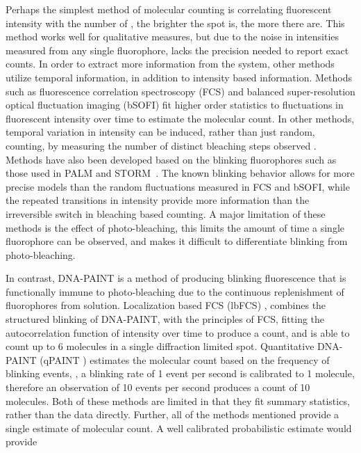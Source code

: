 Perhaps the simplest method of molecular counting is correlating fluorescent
  intensity with the number of \smallobjects \cite{schmied_2012, tolar_2005}, \ie the brighter the spot is, the more there are.
  This method works well for qualitative measures, but due to the noise in intensities 
  measured from any single fluorophore, lacks the precision needed to report exact counts.
  In order to extract more information from the system, other methods utilize temporal information, 
  in addition to intensity based information. 
  Methods such as fluorescence correlation spectroscopy (FCS) \cite{otsuka_2023, wachsmuth_2015, politi_2018} and 
  balanced super-resolution optical fluctuation imaging (bSOFI) \cite{geissbuehler_2012}
  fit higher order statistics to fluctuations in fluorescent intensity over time to estimate the molecular count.
  In other methods, temporal variation in intensity can be induced, rather than just random, \ie
  counting, by measuring the number of distinct bleaching steps observed \cite{ulbrich_2007, jain_2011}.
  Methods have also been developed based on the blinking fluorophores \cite{rollins_stochastic_2015, nino_2017} 
  such as those used in PALM \cite{sengupta_pcPALM_2011, lee_counting_2012} and STORM~\cite{patel_blinking_2021}. 
  The known blinking behavior allows for more precise models than the random fluctuations measured in FCS and bSOFI, while the 
  repeated transitions in intensity provide more information than the irreversible switch in bleaching based counting.
  A major limitation of these methods is the effect of photo-bleaching, this limits the amount of time
  a single fluorophore can be observed, and makes it difficult to differentiate blinking from photo-bleaching.


In contrast, DNA-PAINT \cite{schnitzbauer_2017} is a method of producing blinking fluorescence that is functionally
    immune to photo-bleaching due to the continuous replenishment of fluorophores from solution.
    Localization based FCS (lbFCS) \cite{stein_2021}, combines the structured blinking of DNA-PAINT, with the 
    principles of FCS, fitting the autocorrelation function of intensity over time to produce a count,
    and is able to count up to 6 molecules in a single diffraction limited spot.
    Quantitative DNA-PAINT (qPAINT \cite{jungmann_2016}) estimates the molecular count based on the frequency of blinking events, \ie, 
    a blinking rate of 1 event per second is calibrated to 1 molecule, therefore an observation of 10 events per second
    produces a count of 10 molecules.
    Both of these methods are limited in that they fit summary statistics,
    rather than the data directly. 
    Further, all of the methods mentioned provide a single estimate of molecular count.
    A well calibrated probabilistic estimate would provide 
    
